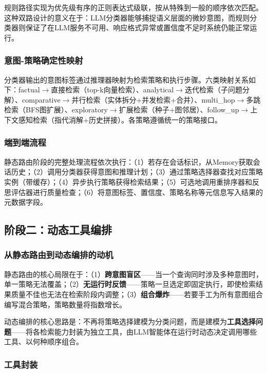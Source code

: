 \documentclass[runningheads]{llncs}
\begin{document}
规则路径实现为优先级有序的正则表达式级联，按从特殊到一般的顺序依次匹配。这种双路设计的意义在于：LLM分类器能够捕捉语义层面的微妙意图，而规则分类器则保证了在LLM服务不可用、响应格式异常或置信度不足时系统仍能正常运行。

\subsubsection{意图-策略确定性映射}

分类器输出的意图标签通过推理器映射为检索策略和执行步骤。六类映射关系如下：factual$\to$直接检索（top-k向量检索）、analytical$\to$迭代检索（子问题分解）、comparative$\to$并行检索（实体拆分+并发检索+合并）、multi\_hop$\to$多跳检索（BFS图扩展）、exploratory$\to$扩展检索（种子+图邻居）、follow\_up$\to$上下文感知检索（指代消解+历史拼接）。各策略遵循统一的策略接口。

\subsubsection{端到端流程}

静态路由阶段的完整处理流程依次执行：（1）若存在会话标识，从Memory获取会话历史；（2）调用分类器获得意图和推理计划；（3）通过策略选择器查找对应策略实例（带缓存）；（4）异步执行策略获得检索结果；（5）可选地调用重排序器和反思评估器进行质量检查；（6）将意图标签、置信度、策略名称等元信息写入结果的元数据字段。

\subsection{阶段二：动态工具编排}

\subsubsection{从静态路由到动态编排的动机}

静态路由的核心局限在于：（1）\textbf{跨意图盲区}——当一个查询同时涉及多种意图时，单一策略无法覆盖；（2）\textbf{无运行时反馈}——策略一旦选定即固定执行，即使检索结果质量不佳也无法在检索阶段内调整；（3）\textbf{组合爆炸}——若要手工为所有意图组合编写混合策略，策略数量将指数增长。

动态编排的核心思路是：不再将策略选择建模为分类问题，而是建模为\textbf{工具选择问题}——将各检索能力封装为独立工具，由LLM智能体在运行时动态决定调用哪些工具、以何种顺序组合。

\subsubsection{工具封装}
\end{document}
